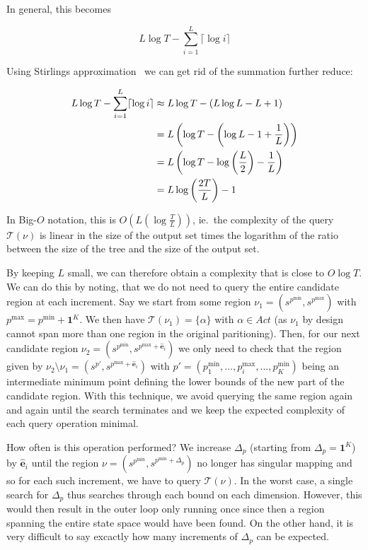 In general, this becomes 

\begin{equation}\label{eq:runtimeWithCeil}
    L \log T - \sum^{L}_{i=1} \lceil \log i \rceil 
\end{equation}

Using Stirlings approximation~\cite{m.t.l.b.IntroductionProbabilityTheory1951}
we can get rid of the summation further reduce:

\begin{align}
    L \log T - \sum^{L}_{i=1} \lceil \log i \rceil \notag
    &\approx L \log T - (L \log L - L + 1) \notag \\
    &= L \left(
            \log T - \left( \log L - 1 + \frac{1}{L} \right)
         \right) \notag \\
    &= L \left(
            \log T - \log \left( \frac{L}{2} \right) - \frac{1}{L}
         \right) \notag \\
    &= L \log \left( \frac{2T}{L} \right) - 1
\end{align}

In Big-$O$ notation, this is $O(L\left( \log \frac{T}{L} \right))$, ie.\ the
complexity of the query $\mathcal{T}(\nu)$ is linear in the size of the output
set times the logarithm of the ratio between the size of the tree and the size
of the output set.

By keeping $L$ small, we can therefore obtain a complexity that is close to $O
\log T$. We can do this by noting, that we do not need to query the entire
candidate region at each increment. Say we start from some region $\nu_{1} =
(s^{p^{\min}}, s^{p^{\max}})$ with $p^{\max} = p^{\min} + \mathbf{1}^{K}$. We
then have $\mathcal{T}(\nu_{1}) = \{ \alpha \}$ with $\alpha \in Act$ (as
$\nu_{1}$ by design cannot span more than one region in the original
paritioning). Then, for our next candidate region $\nu_{2} = (s^{p^{\min}},
s^{p^{\max} + \mathbf{\hat{e}}_{i}})$ we only need to check that the region
given by $\nu_{2} \setminus \nu_{1} = (s^{p'}, s^{p^{\max} +
\mathbf{\hat{e}}_{i}})$ with $p' = (p^{\min}_{1}, \ldots, p^{\max}_{i}, \ldots,
p^{\min}_{K})$ being an intermediate minimum point defining the lower bounds of
the new part of the candidate region. With this technique, we avoid querying the
same region again and again until the search terminates and we keep the expected
complexity of each query operation minimal.

How often is this operation performed? We increase $\Delta_{p}$ (starting from
$\Delta_{p} = \mathbf{1}^{K}$) by $\mathbf{\hat{e}}_{i}$ until the region $\nu =
(s^{p^{\min}}, s^{p^{\min} + \Delta_{p}})$ no longer has singular mapping and so
for each such increment, we have to query $\mathcal{T}(\nu)$. In the worst case,
a single search for $\Delta_{p}$ thus searches through each bound on each
dimension. However, this would then result in the outer loop only running once
since then a region spanning the entire state space would have been found. On
the other hand, it is very difficult to say excactly how many increments of
$\Delta_{p}$ can be expected.


